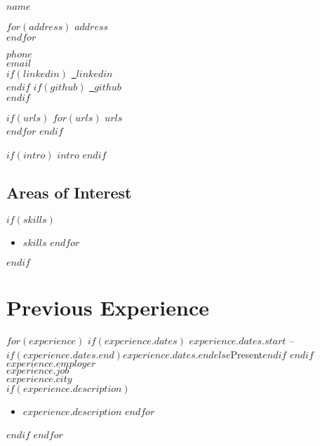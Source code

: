 \documentclass[$fontsize$, a4paper]{article}
\newcommand{\note}[1]{\marginnote{\scriptsize #1}}
\begin{document}
{\LARGE $name$}\\[.2cm]

\begin{multicols}{2}

$for(address)$
$address$\\
$endfor$

\vspace{-10pt}

$phone$\\
\href{mailto:$email$}{$email$}\\

\columnbreak
$if(linkedin)$
\href{https://www.linkedin.com/in/$linkedin$/}{\faLinkedin \, $linkedin$}\\
$endif$
$if(github)$
\href{https://github.com/$github$}{\faGithub \, $github$}\\
$endif$

$if(urls)$
$for(urls)$
\href{http://$urls$}{$urls$}\\
$endfor$
$endif$

\end{multicols}

\vspace{30pt}

$if(intro)$
$intro$
$endif$

\subsection*{Areas of Interest}
$if(skills)$
\begin{itemize}
    $for(skills)$
      \item $skills$
    $endfor$
\end{itemize}
$endif$


\vspace{25pt}

\section*{Previous Experience}
\noindent
$for(experience)$
\note
$if(experience.dates)$
  {$experience.dates.start$ -- $if(experience.dates.end)$$experience.dates.end$$else$Present$endif$}
$endif$
\textsc{$experience.employer$}\\
\emph{$experience.job$}\\
$experience.city$\\
$if(experience.description)$
\begin{itemize}
    $for(experience.description)$
      \item $experience.description$
    $endfor$
\end{itemize}
$endif$
$endfor$
\end{document}
